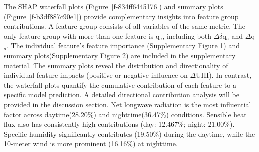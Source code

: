 \documentclass[]{nature}
\makeatletter
\renewenvironment{figure}
               {\@float{figure}}
               {\end@float}
\renewenvironment{figure*}
               {\@dblfloat{figure}}
               {\end@dblfloat}
\def\fixFloatSize#1{}%
\def\fixFloatSize#1{}
\makeatother
\begin{document}
\bgroup
\fixFloatSize{images/0923132c-4c59-4c36-a92b-a97d1d808722-ugroup_summary_day_night.png}
\begin{figure*}[!htbp]
\centering \makeatletter{}
\makeatother 
\caption{{\textbf{SHAP summary plots showing the distribution and magnitude of feature group impacts}. (a (daytime), b (nighttime)) Each point represents a single instance; the horizontal position indicates the SHAP value (positive values denote an increase in predicted \ensuremath{\Delta }UHI, negative a decrease); the color represents the original feature values (blue: low, red: high).}}
\label{f-b3df887c90e1}
\end{figure*}
\egroup
The SHAP waterfall plots (Figure~\ref{f-834ff6445176}) and summary plots (Figure~\ref{f-b3df887c90e1}) provide complementary insights into feature group contributions. A feature group consists of all variables of the same metric. The only feature group with more than one feature is q\ensuremath{_{a}}, including both \ensuremath{\Delta }\ensuremath{\delta }q\ensuremath{_{a}} and \ensuremath{\Delta }q\ensuremath{_{a}}. The individual feature's feature importance (Supplementary Figure 1) and summary plots(Supplementary Figure 2) are included in the supplementary material. The summary plots reveal the distribution and directionality of individual feature impacts (positive or negative influence on \ensuremath{\Delta }UHI). \mbox{}\protect\newline In contrast, the waterfall plots quantify the cumulative contribution of each feature to a specific model prediction. A detailed directional contribution analysis will be provided in the discussion section. Net longwave radiation is the most influential factor across daytime(28.20\%) and nighttime(36.47\%) conditions. Sensible heat flux also has consistently high contributions (day: 12.467\%; night: 21.00\%). Specific humidity significantly contributes (19.50\%) during the daytime, while the 10-meter wind is more prominent (16.16\%) at nighttime.
\end{document}
